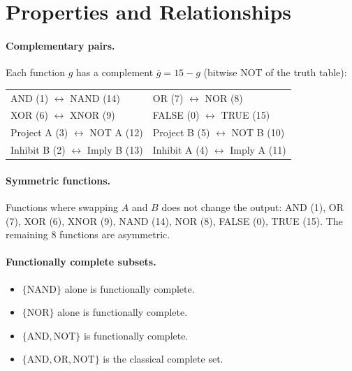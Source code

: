 \section{Properties and Relationships}
\label{sec:gate-properties}

\paragraph{Complementary pairs.}
Each function $g$ has a complement $\bar{g} = 15 - g$ (bitwise NOT
of the truth table):
\begin{center}
\begin{tabular}{@{}ll@{}}
  AND (1) $\leftrightarrow$ NAND (14) &
  OR (7) $\leftrightarrow$ NOR (8) \\
  XOR (6) $\leftrightarrow$ XNOR (9) &
  FALSE (0) $\leftrightarrow$ TRUE (15) \\
  Project A (3) $\leftrightarrow$ NOT A (12) &
  Project B (5) $\leftrightarrow$ NOT B (10) \\
  Inhibit B (2) $\leftrightarrow$ Imply B (13) &
  Inhibit A (4) $\leftrightarrow$ Imply A (11) \\
\end{tabular}
\end{center}

\paragraph{Symmetric functions.}
Functions where swapping $A$ and $B$ does not change the output:
AND (1), OR (7), XOR (6), XNOR (9), NAND (14), NOR (8), FALSE (0),
TRUE (15). The remaining 8 functions are asymmetric.

\paragraph{Functionally complete subsets.}
\begin{itemize}
  \item $\{\text{NAND}\}$ alone is functionally complete.
  \item $\{\text{NOR}\}$ alone is functionally complete.
  \item $\{\text{AND}, \text{NOT}\}$ is functionally complete.
  \item $\{\text{AND}, \text{OR}, \text{NOT}\}$ is the classical
    complete set.
\end{itemize}

